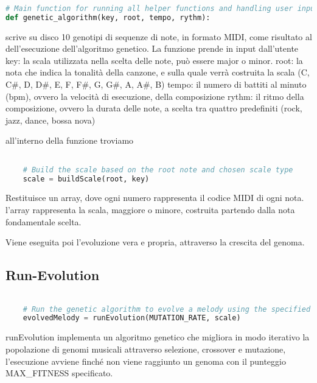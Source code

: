 \documentclass[a4paper,12pt]{report}
\begin{document}
\begin{lstlisting}[language=Python]
 
# Main function for running all helper functions and handling user input.
def genetic_algorithm(key, root, tempo, rythm):

\end{lstlisting}

scrive su disco 10 genotipi di sequenze di note, in formato MIDI, come risultato al dell'esecuzione dell'algoritmo genetico.
La funzione prende in input dall'utente
key: la scala utilizzata nella scelta delle note, può essere major o minor.
root: la nota che indica la tonalità della canzone, e sulla quale verrà costruita la scala (C, C#, D, D#, E, F, F#, G, G#, A, A#, B)
tempo: il numero di battiti al minuto (bpm), ovvero la velocità di esecuzione, della composizione
rythm: il ritmo della composizione, ovvero la durata delle note, a scelta tra quattro predefiniti (rock, jazz, dance, bossa nova)

all'interno della funzione troviamo

\begin{lstlisting}[language=Python]

    # Build the scale based on the root note and chosen scale type
    scale = buildScale(root, key)

\end{lstlisting}

Restituisce un array, dove ogni numero rappresenta il codice MIDI di ogni nota. l'array rappresenta la scala, maggiore o minore, costruita partendo dalla nota fondamentale scelta.

Viene eseguita poi l'evoluzione vera e propria, attraverso la crescita del genoma.

\subsection{Run-Evolution}

\begin{lstlisting}[language=Python]

    # Run the genetic algorithm to evolve a melody using the specified mutation rate and scale
    evolvedMelody = runEvolution(MUTATION_RATE, scale)

\end{lstlisting}

runEvolution implementa un algoritmo genetico che migliora in modo iterativo la popolazione di genomi musicali attraverso selezione, crossover e mutazione, l'esecuzione avviene finché non viene raggiunto un genoma con il punteggio MAX_FITNESS specificato.
\end{document}
